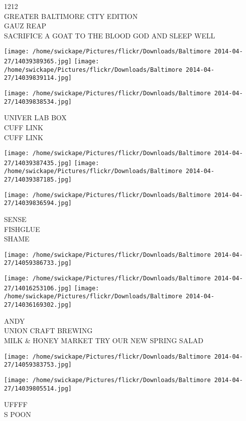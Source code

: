 \documentclass[10pt,letterpaper]{article}
\begin{document}
1212\\
GREATER BALTIMORE CITY EDITION\\
GAUZ REAP\\
SACRIFICE A GOAT TO THE BLOOD GOD AND SLEEP WELL
\pagebreak

\texttt{[image: /home/swickape/Pictures/flickr/Downloads/Baltimore 2014-04-27/14039389365.jpg]}
\texttt{[image: /home/swickape/Pictures/flickr/Downloads/Baltimore 2014-04-27/14039839114.jpg]}

\vspace{0.25in}
\texttt{[image: /home/swickape/Pictures/flickr/Downloads/Baltimore 2014-04-27/14039838534.jpg]}

UNIVER LAB BOX\\
CUFF LINK\\
CUFF LINK
\pagebreak

\texttt{[image: /home/swickape/Pictures/flickr/Downloads/Baltimore 2014-04-27/14039387435.jpg]}
\texttt{[image: /home/swickape/Pictures/flickr/Downloads/Baltimore 2014-04-27/14039387185.jpg]}

\texttt{[image: /home/swickape/Pictures/flickr/Downloads/Baltimore 2014-04-27/14039836594.jpg]}

SENSE\\
FISHGLUE\\
SHAME
\pagebreak

\texttt{[image: /home/swickape/Pictures/flickr/Downloads/Baltimore 2014-04-27/14059386733.jpg]}

\vspace{0.25in}
\texttt{[image: /home/swickape/Pictures/flickr/Downloads/Baltimore 2014-04-27/14016253106.jpg]}
\texttt{[image: /home/swickape/Pictures/flickr/Downloads/Baltimore 2014-04-27/14036169302.jpg]}

ANDY\\
UNION CRAFT BREWING\\
MILK \& HONEY MARKET TRY OUR NEW SPRING SALAD
\pagebreak

\texttt{[image: /home/swickape/Pictures/flickr/Downloads/Baltimore 2014-04-27/14059383753.jpg]}

\vspace{0.25in}
\texttt{[image: /home/swickape/Pictures/flickr/Downloads/Baltimore 2014-04-27/14039805514.jpg]}

UFFFF\\
S POON
\pagebreak
\end{document}
